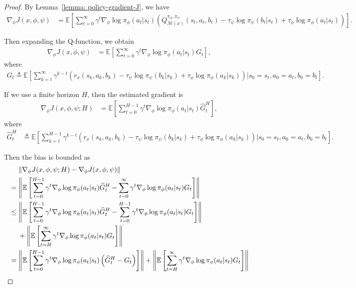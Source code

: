\documentclass{article}
\theoremstyle{plain}
\theoremstyle{definition}
\theoremstyle{remark}
\def\E{\mathbb E}
\def\cM{\mathcal M}
\def\bydef{\triangleq}
\begin{document}
\begin{proof}
    By Lemma~\ref{lemma: policy-gradient-J}, we have
    \begin{align}
        \nabla_\phi J(x,\phi,\psi) & = \E \left[ \sum_{t=0}^{\infty} \gamma^t \nabla_\phi \log \pi_\phi(a_t|s_t) \left( Q^{\pi_\phi,\pi_\psi}_{\cM(x)}(s_t,a_t,b_t) - \tau_\psi \log \pi_\psi(b_t|s_t) + \tau_\phi \log \pi_\phi(a_t|s_t) \right)\right].
    \end{align}


    Then expanding the Q-function, we obtain
    \begin{align}
        \nabla_\phi J(x,\phi,\psi)  
        & =  \E \left[ \sum_{t=0}^{\infty} \gamma^t \nabla_\phi \log \pi_\phi(a_t|s_t) G_t\right] ,
    \end{align}
    where 
    \begin{align}
        G_t \bydef \E \left[ \sum_{k=t}^\infty \gamma^{k-t} \left(r_x(s_k,a_k,b_k) - \tau_\psi \log \pi_\psi(b_k|s_k) + \tau_\phi \log \pi_\phi(a_k|s_k) \right) \bigg| s_0 = s_t, a_0 = a_t, b_0 = b_t \right] .
    \end{align}

    If we use a finite horizon $H$, then the estimated gradient is
    \begin{align}
        \nabla_\phi J(x,\phi,\psi; H) & = \E \left[ \sum_{t=0}^{H-1} \gamma^t \nabla_\phi \log \pi_\phi(a_t|s_t) \widehat{G}_t^H \right] ,
    \end{align}
    where 
    \begin{align}
        \widehat{G}_t^H & \bydef  \E \left[ \sum_{k=t}^{H-1} \gamma^{k-t} \left(r_x(s_k,a_k,b_k) - \tau_\psi \log \pi_\psi(b_k|s_k) + \tau_\phi \log \pi_\phi(a_k|s_k) \right) \bigg| s_0 = s_t, a_0 = a_t, b_0 = b_t \right].
    \end{align}
   
    Then the bias is bounded as
    \begin{align}
        & \quad \, \left\| \nabla_\phi J(x,\phi,\psi; H) - \nabla_\phi J(x,\phi,\psi) \right\| \nonumber \\
        & = \left\| \E \left[ \sum_{t=0}^{H-1}  \gamma^t\nabla_\phi \log \pi_\phi(a_t|s_t) \widehat{G}_t^H -  \sum_{t=0}^\infty \gamma^t \nabla_\phi \log \pi_\phi(a_t|s_t) G_t  \right] \right\|\notag \\
        & \leq  \left\| \E \left[ \sum_{t=0}^{H-1} \gamma^t \nabla_\phi \log \pi_\phi(a_t|s_t) \widehat{G}_t^H -  \sum_{t=0}^{H-1} \gamma^t \nabla_\phi \log \pi_\phi(a_t|s_t) G_t  \right]\right\| \notag\\
        & \quad \; +  \left\| \E \left[ \sum_{t=H}^\infty \gamma^t \nabla_\phi \log \pi_\phi(a_t|s_t) G_t  \right] \right\| \notag\\
        & = \left\| \E \left[ \sum_{t=0}^{H-1} \gamma^t \nabla_\phi \log \pi_\phi(a_t|s_t) \left( \widehat{G}_t^H - G_t \right)  \right] \right\| +  \left\| \E \left[ \sum_{t=H}^\infty \gamma^t \nabla_\phi \log \pi_\phi(a_t|s_t) G_t  \right] \right\| 
    \end{align}
    

\end{proof}
\end{document}
